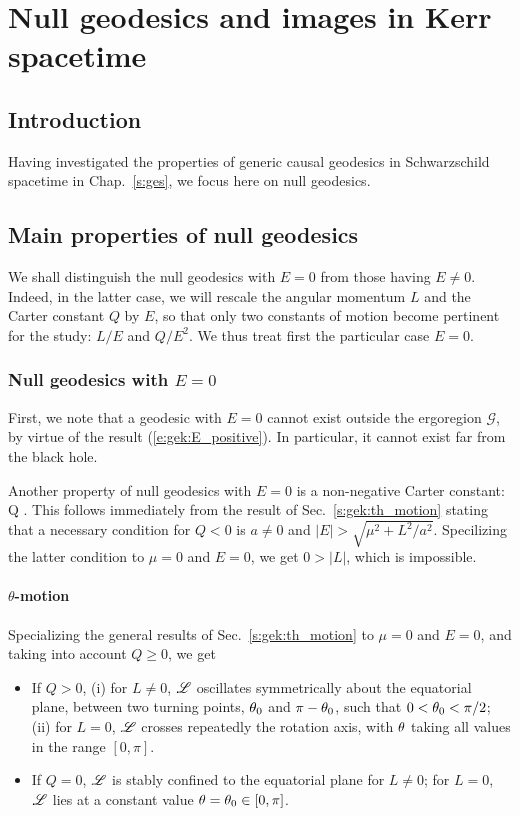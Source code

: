 \chapter{Null geodesics and images in Kerr spacetime}
\label{s:gik}

\minitoc

\section{Introduction}

Having investigated the properties of generic causal geodesics
in Schwarzschild spacetime in Chap.~\ref{s:ges}, we focus here on null
geodesics.


\section{Main properties of null geodesics} \label{s:gik:properties}

We shall distinguish the null geodesics with $E=0$ from those having
$E \neq 0$. Indeed, in the latter case, we will rescale the angular momentum
$L$ and the Carter constant $Q$ by $E$, so that only two constants of motion become
pertinent for the study: $L/E$ and $Q/E^2$.
We thus treat first the particular case $E=0$.

\subsection{Null geodesics with $E=0$}


First, we note that a geodesic with $E=0$ cannot exist outside the ergoregion
$\mathscr{G}$, by virtue of the result (\ref{e:gek:E_positive}). In particular,
it cannot exist far from the black hole.

Another property of null geodesics with $E=0$ is a non-negative Carter constant:
\be
    Q  .
\ee
This follows immediately from the result of Sec.~\ref{s:gek:th_motion}
stating that a necessary condition for $Q < 0$ is $a\neq 0$ and
$|E| > \sqrt{\mu^2 + L^2/a^2}$. Specilizing the latter condition to $\mu=0$
and $E=0$, we get $0 > |L|$, which is impossible.

\subsubsection{$\theta$-motion}

Specializing the general results of Sec.~\ref{s:gek:th_motion} to $\mu=0$ and $E=0$,
and taking into account $Q \geq 0$, we get
\begin{greybox}
\begin{itemize}
\item If $Q>0$, (i) for $L\neq 0$, $\mathscr{L}$ oscillates symmetrically about the equatorial plane,
between two turning points, $\theta_0$ and $\pi-\theta_0$, such that $0<\theta_0<\pi/2$;
(ii) for $L=0$, $\mathscr{L}$
crosses repeatedly the rotation axis, with $\theta$ taking all values in the
range $[0,\pi]$.
\item If $Q=0$, $\mathscr{L}$ is stably confined to the equatorial plane
for $L \neq 0$;
for $L=0$, $\mathscr{L}$ lies at a constant value $\theta=\theta_0\in[0,\pi]$.
\end{itemize}
\end{greybox}


